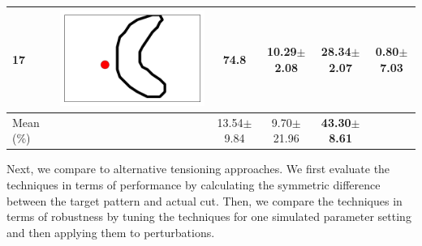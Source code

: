 \begin{table}[t]
{\begin{tabular}{llcccc}
17 &   \includegraphics[height= \shapesize cm]{tps-experiments/shapes/pts_7.png} &        74.8 &           10.29$\pm$2.08 &  \textbf{28.34$\pm$2.07} &            0.80$\pm$7.03 \\
\midrule
\rowcolor[HTML]{FFC72C}
\multicolumn{2}{c} { Mean (\%)} &  &13.54$\pm$9.84 &
9.70$\pm$21.96 & 
\textbf{43.30$\pm$8.61}  \\
\bottomrule
\end{tabular}
}
\vspace{-10pt}
\end{table}

	
Next, we compare \tpsalgo to alternative tensioning approaches.
We first evaluate the techniques in terms of performance by calculating the symmetric difference between the target pattern and actual cut.
Then, we compare the techniques in terms of robustness by tuning the techniques for one simulated parameter setting and then applying them to perturbations.

